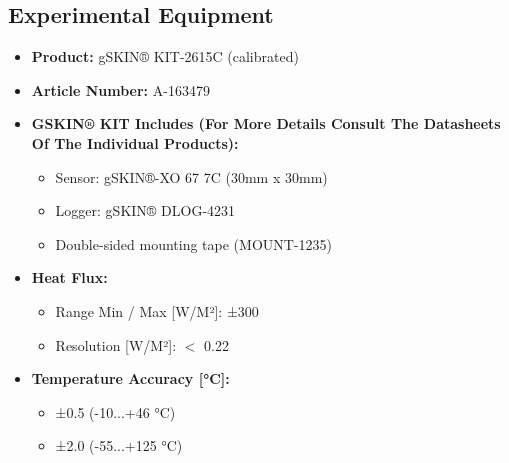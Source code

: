 

\begin{theappendices}


\chapter{Experimental Equipment}




\begin{table}[tbh]

\begin{framed}
    

\begin{itemize}
    \setlength\itemsep{-0.2em}
    \item \textbf{Product:} gSKIN® KIT-2615C (calibrated)
    \item \textbf{Article Number:} A-163479
    \item \textbf{GSKIN® KIT Includes (For More Details Consult The Datasheets Of The Individual Products):}
    \begin{itemize}
        \item Sensor: gSKIN®-XO 67 7C (30mm x 30mm)
        \item Logger: gSKIN® DLOG-4231
        \item Double-sided mounting tape (MOUNT-1235)
    \end{itemize}
    \item \textbf{Heat Flux:}
    \begin{itemize}
        \item Range Min / Max [W/M²]: ±300
        \item Resolution [W/M²]: $<$ 0.22
    \end{itemize}
    \item \textbf{Temperature Accuracy [°C]:}
    \begin{itemize}
        \item ±0.5 (-10...+46 °C)
        \item ±2.0 (-55...+125 °C)
    \end{itemize}
    

\end{itemize}
\end{framed}
\end{table}
\end{theappendices}
